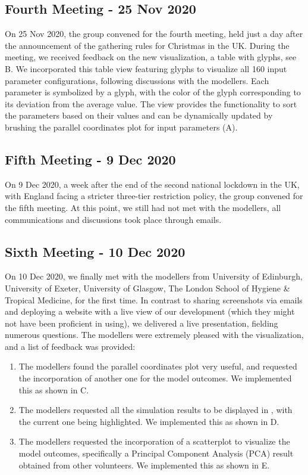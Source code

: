 \subsection{Fourth Meeting - 25 Nov 2020}
On 25 Nov 2020, the group convened for the fourth meeting, held just a day after the announcement of the gathering rules for Christmas in the UK.
During the meeting, we received feedback on the new visualization, a table with glyphs, see B. We incorporated this table view featuring glyphs to visualize all 160 input parameter configurations, following discussions with the modellers.
Each parameter is symbolized by a glyph, with the color of the glyph corresponding to its deviation from the average value.
The view provides the functionality to sort the parameters based on their values and can be dynamically updated by brushing the parallel coordinates plot for input parameters (A).

\subsection{Fifth Meeting - 9 Dec 2020}
On 9 Dec 2020, a week after the end of the second national lockdown in the UK, with England facing a stricter three-tier restriction policy, the group convened for the fifth meeting.
At this point, we still had not met with the modellers, all communications and discussions took place through emails.

\subsection{Sixth Meeting - 10 Dec 2020}
On 10 Dec 2020, we finally met with the modellers from University of Edinburgh, University of Exeter, University of Glasgow, The London School of Hygiene \& Tropical Medicine, for the first time.
In contrast to sharing screenshots via emails and deploying a website with a live view of our development (which they might not have been proficient in using), we delivered a live presentation, fielding numerous questions.
The modellers were extremely pleased with the visualization, and a list of feedback was provided:
\begin{enumerate}
    \item The modellers found the parallel coordinates plot very useful, and requested the incorporation of another one for the model outcomes. We implemented this as shown in C.
    \item The modellers requested all the simulation results to be displayed in , with the current one being highlighted. We implemented this as shown in D.
    \item The modellers requested the incorporation of a scatterplot to visualize the model outcomes, specifically a Principal Component Analysis (PCA) result obtained from other volunteers. We implemented this as shown in E.
\end{enumerate}

